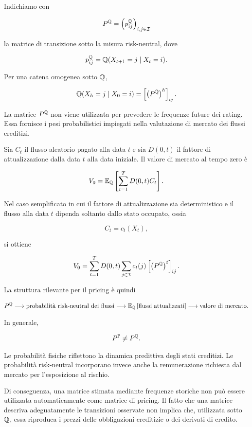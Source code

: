 \label{subsec:cap9-matrice-risk-neutral}

Indichiamo con

\[
P^{\mathbb{Q}}
=
\left(
p_{ij}^{\mathbb{Q}}
\right)_{i,j\in\mathcal{I}}
\]

la matrice di transizione sotto la misura risk-neutral, dove

\[
p_{ij}^{\mathbb{Q}}
=
\mathbb{Q}(X_{t+1}=j\mid X_t=i).
\]

Per una catena omogenea sotto $\mathbb{Q}$,

\[
\mathbb{Q}(X_h=j\mid X_0=i)
=
\left[
\left(P^{\mathbb{Q}}\right)^h
\right]_{ij}.
\]

La matrice $P^{\mathbb{Q}}$ non viene utilizzata per prevedere le frequenze
future dei rating. Essa fornisce i pesi probabilistici impiegati nella
valutazione di mercato dei flussi creditizi.

Sia $C_t$ il flusso aleatorio pagato alla data $t$ e sia $D(0,t)$ il
fattore di attualizzazione dalla data $t$ alla data iniziale. Il valore
di mercato al tempo zero \`{e}

\[
V_0
=
\mathbb{E}_{\mathbb{Q}}
\left[
\sum_{t=1}^{T}
D(0,t)C_t
\right].
\]

Nel caso semplificato in cui il fattore di attualizzazione sia
deterministico e il flusso alla data $t$ dipenda soltanto dallo stato
occupato, ossia

\[
C_t=c_t(X_t),
\]

si ottiene

\[
V_0
=
\sum_{t=1}^{T}
D(0,t)
\sum_{j\in\mathcal{I}}
c_t(j)
\left[
\left(P^{\mathbb{Q}}\right)^t
\right]_{ij}.
\]

La struttura rilevante per il pricing \`{e} quindi

\[
P^{\mathbb{Q}}
\longrightarrow
\text{probabilit\`{a} risk-neutral dei flussi}
\longrightarrow
\mathbb{E}_{\mathbb{Q}}
\left[
\text{flussi attualizzati}
\right]
\longrightarrow
\text{valore di mercato}.
\]

In generale,

\[
P^{\mathbb{P}}
\neq
P^{\mathbb{Q}}.
\]

Le probabilit\`{a} fisiche riflettono la dinamica predittiva degli
stati creditizi. Le probabilit\`{a} risk-neutral incorporano invece
anche la remunerazione richiesta dal mercato per l'esposizione al
rischio.

Di conseguenza, una matrice stimata mediante frequenze storiche non
pu\`{o} essere utilizzata automaticamente come matrice di pricing. Il
fatto che una matrice descriva adeguatamente le transizioni osservate
non implica che, utilizzata sotto $\mathbb{Q}$, essa riproduca i prezzi delle
obbligazioni creditizie o dei derivati di credito.

